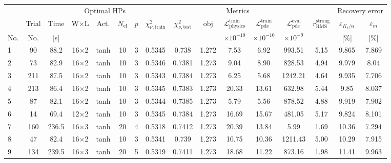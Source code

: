 \begin{tabular}{lcc cccc ccccccc cc}
\toprule
& & & \multicolumn{4}{c}{Optimal HPs} & \multicolumn{7}{c}{Metrics} & \multicolumn{2}{c}{Recovery error} \\
\cmidrule(lr){4-7}\cmidrule(lr){8-14}\cmidrule(lr){15-16}
& Trial & Time & W$\times$L & Act. & $N_{\mathrm{el}}$ & $p$ & $\chi^2_{\nu,\mathrm{train}}$ & $\chi^2_{\nu,\mathrm{test}}$ & $\mathrm{obj}$ & $\mathcal{L}_{\mathrm{physics}}^{\mathrm{train}}$ & $\mathcal{L}_{\mathrm{pde}}^{\mathrm{train}}$ & $\mathcal{L}_{\mathrm{pde}}^{\mathrm{eval}}$ & $r_{\mathrm{RMS}}^{\mathrm{strong}}$ & $\varepsilon_{K_{\mathrm{s}}/\alpha}$ & $\varepsilon_{m}$ \\
No. & No. & [s] &  &  &  &  &  &  &  & $\times 10^{-10}$ & $\times 10^{-10}$ & $\times 10^{-9}$ &  & [\%] & [\%] \\
\midrule
  1 & 90 & 88.2 & 16$\times$2 & tanh & 10 & 3 & \num{0.5345} & \num{0.738} & \num{1.272} & 7.53 & 6.92 & 993.51 & 5.15 & \num{9.865} & \num{7.869} \\
  2 & 73 & 82.9 & 16$\times$2 & tanh & 10 & 3 & \num{0.5346} & \num{0.7381} & \num{1.273} & 9.04 & 8.90 & 828.53 & 4.94 & \num{9.979} & \num{8.04} \\
  3 & 211 & 87.5 & 16$\times$2 & tanh & 10 & 3 & \num{0.5343} & \num{0.7384} & \num{1.273} & 6.25 & 5.68 & 1242.21 & 4.64 & \num{9.935} & \num{7.706} \\
  4 & 213 & 86.4 & 16$\times$2 & tanh & 10 & 3 & \num{0.5345} & \num{0.7383} & \num{1.273} & 20.33 & 13.61 & 632.98 & 5.44 & \num{9.85} & \num{8.037} \\
  5 & 87 & 82.1 & 16$\times$2 & tanh & 10 & 3 & \num{0.5344} & \num{0.7385} & \num{1.273} & 5.79 & 5.56 & 878.52 & 4.88 & \num{9.919} & \num{7.902} \\
  6 & 14 & 69.4 & 12$\times$2 & tanh & 10 & 3 & \num{0.5345} & \num{0.7384} & \num{1.273} & 16.69 & 15.67 & 481.05 & 5.17 & \num{9.824} & \num{8.101} \\
  7 & 160 & 236.5 & 16$\times$3 & tanh & 20 & 4 & \num{0.5318} & \num{0.7412} & \num{1.273} & 20.39 & 13.84 & 5.99 & 1.69 & \num{10.36} & \num{7.294} \\
  8 & 47 & 82.4 & 16$\times$2 & tanh & 10 & 3 & \num{0.5341} & \num{0.739} & \num{1.273} & 10.75 & 10.36 & 1211.43 & 5.00 & \num{10.29} & \num{7.915} \\
  9 & 134 & 239.5 & 16$\times$3 & tanh & 20 & 5 & \num{0.5319} & \num{0.7411} & \num{1.273} & 18.68 & 11.22 & 873.16 & 1.98 & \num{11.41} & \num{9.963} \\

\end{tabular}
